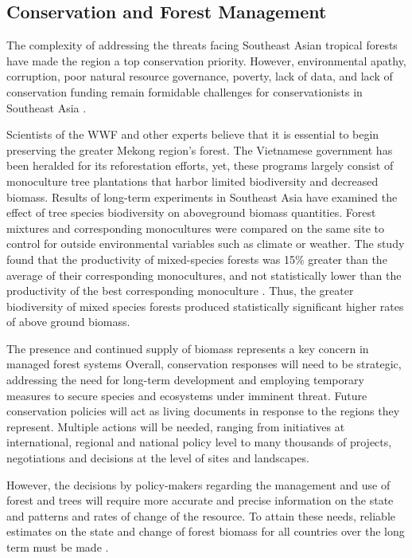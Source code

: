 \subsection{Conservation and Forest Management}

The complexity of addressing the threats facing Southeast Asian tropical forests have made the region a top conservation priority. However, environmental apathy, corruption, poor natural resource governance, poverty, lack of data, and lack of conservation funding remain formidable challenges for conservationists in Southeast Asia \citep{sodhi2004southeast}.

Scientists of the WWF and other experts believe that it is essential to begin preserving the greater Mekong region's forest. The Vietnamese government has been heralded for its reforestation efforts, yet, these programs largely consist of monoculture tree plantations that harbor limited biodiversity and decreased biomass. Results of long-term experiments in Southeast Asia have examined the effect of tree species biodiversity on aboveground biomass quantities. Forest mixtures and corresponding monocultures were compared on the same site to control for outside environmental variables such as climate or weather. The study found that the productivity of mixed-species forests was 15\% greater than the average of their corresponding monocultures, and not statistically lower than the productivity of the best corresponding monoculture \citep{sunderland2012evidence}. Thus, the greater biodiversity of mixed species forests produced statistically significant higher rates of above ground biomass.

The presence and continued supply of biomass represents a key concern in managed forest systems  Overall, conservation responses will need to be strategic, addressing the need for long-term development and employing temporary measures to secure species and ecosystems under imminent threat. Future conservation policies will act as living documents in response to the regions they represent. Multiple actions will be needed, ranging from initiatives at international, regional and national policy level to many thousands of projects, negotiations and decisions at the level of sites and landscapes. 

However, the decisions by policy-makers regarding the management and use of forest and trees will require more accurate and precise information on the state and patterns and rates of change of the resource. To attain these needs, reliable estimates on the state and change of forest biomass for all countries over the long term must be made \citep{brown1991biomass}. 

